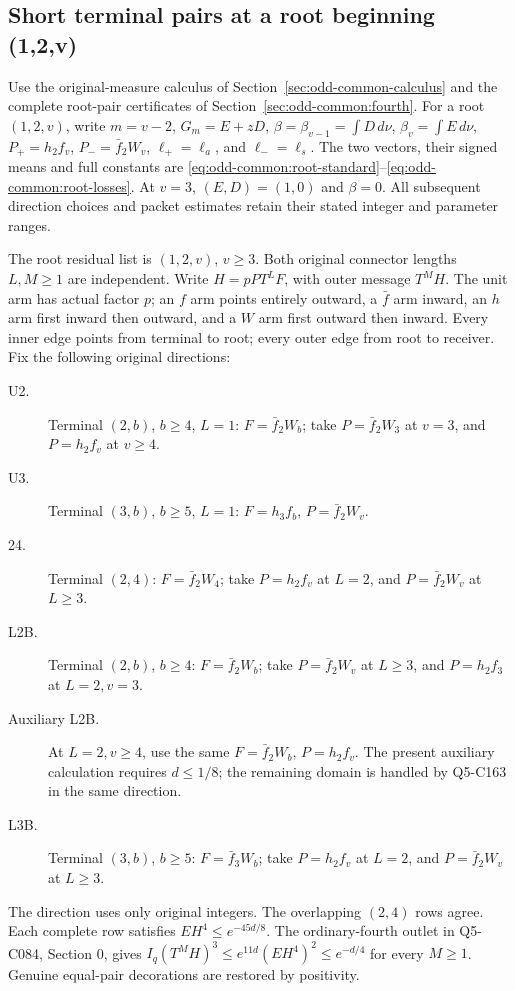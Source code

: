 \subsection{Short terminal pairs at a root beginning (1,2,v)}\label{proof:Q5-C160}
Use the original-measure calculus of
Section~\ref{sec:odd-common-calculus} and the complete root-pair
certificates of Section~\ref{sec:odd-common:fourth}.
For a root \((1,2,v)\), write \(m=v-2\), \(G_m=E+zD\),
\(\beta=\beta_{v-1}=\int D\,d\nu\),
\(\beta_v=\int E\,d\nu\),
\(P_+=h_2f_v\), \(P_-=\bar f_2W_v\),
\(\ell_+=\ell_a\), and \(\ell_-=\ell_s\).
The two vectors, their signed means and full constants are
\eqref{eq:odd-common:root-standard}--\eqref{eq:odd-common:root-losses}.
At \(v=3\), \((E,D)=(1,0)\) and \(\beta=0\).
All subsequent direction choices and packet estimates retain their
stated integer and parameter ranges.

The root residual list is $(1,2,v)$, $v\ge3$. Both original connector lengths $L,M\ge1$ are independent. Write $H=pP T^LF$, with outer message $T^MH$. The unit arm has actual factor $p$; an $f$ arm points entirely outward, a $\bar f$ arm inward, an $h$ arm first inward then outward, and a $W$ arm first outward then inward. Every inner edge points from terminal to root; every outer edge from root to receiver. Fix the following original directions:
\begin{description}
\item[U2.] Terminal $(2,b)$, $b\ge4$, $L=1$: $F=\bar f_2W_b$; take $P=\bar f_2W_3$ at $v=3$, and $P=h_2f_v$ at $v\ge4$.
\item[U3.] Terminal $(3,b)$, $b\ge5$, $L=1$: $F=h_3f_b$, $P=\bar f_2W_v$.
\item[24.] Terminal $(2,4)$: $F=\bar f_2W_4$; take $P=h_2f_v$ at $L=2$, and $P=\bar f_2W_v$ at $L\ge3$.
\item[L2B.] Terminal $(2,b)$, $b\ge4$: $F=\bar f_2W_b$; take $P=\bar f_2W_v$ at $L\ge3$, and $P=h_2f_3$ at $L=2,v=3$.
\item[Auxiliary L2B.] At $L=2,v\ge4$, use the same $F=\bar f_2W_b$, $P=h_2f_v$. The present auxiliary calculation requires $d\le1/8$; the remaining domain is handled by Q5-C163 in the same direction.
\item[L3B.] Terminal $(3,b)$, $b\ge5$: $F=\bar f_3W_b$; take $P=h_2f_v$ at $L=2$, and $P=\bar f_2W_v$ at $L\ge3$.
\end{description}
The direction uses only original integers. The overlapping $(2,4)$ rows agree. Each complete row satisfies $EH^4\le e^{-45d/8}$. The ordinary-fourth outlet in Q5-C084, Section 0, gives $I_q(T^MH)^3\le e^{11d}(EH^4)^2\le e^{-d/4}$ for every $M\ge1$. Genuine equal-pair decorations are restored by positivity.

